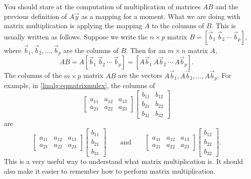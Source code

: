 \documentclass{ximera}
\begin{document}
You should stare at the computation of multiplication of matrices $AB$ and the previous definition of $A\vec{y}$ as a mapping for a moment. What we are doing with matrix multiplication is applying the mapping $A$ to the columns of $B$.  This is usually written as follows. Suppose we write the $n \times p$ matrix $B = [ \vec{b}_1 ~ \vec{b}_2 ~ \cdots ~ \vec{b}_p ]$, where $\vec{b}_1, \vec{b}_2, \ldots, \vec{b}_p$ are the columns of $B$. Then for an $m \times n$ matrix $A$,
\begin{equation*}
    AB =  A [ \vec{b}_1 ~ \vec{b}_2 ~ \cdots ~ \vec{b}_p ] = [ A\vec{b}_1 ~ A\vec{b}_2 ~ \cdots ~ A\vec{b}_p ] .
\end{equation*}
The columns of the $m \times p$ matrix $AB$ are the vectors $A\vec{b}_1, A\vec{b}_2, \ldots, A\vec{b}_p$. For example, in \eqref{linalg:eqmatrixmulex}, the columns of 
\begin{equation*}
    \begin{bmatrix}
        a_{11} & a_{12} & a_{13} \\
        a_{21} & a_{22} & a_{23}
    \end{bmatrix}
    \begin{bmatrix}
        b_{11} & b_{12} \\
        b_{21} & b_{22} \\
        b_{31} & b_{32}
    \end{bmatrix}
\end{equation*}
are
\begin{equation*}
    \begin{bmatrix}
        a_{11} & a_{12} & a_{13} \\
        a_{21} & a_{22} & a_{23}
    \end{bmatrix}
    \begin{bmatrix}
        b_{11} \\
        b_{21} \\
        b_{31}
    \end{bmatrix}
    \qquad \text{and} \qquad
    \begin{bmatrix}
        a_{11} & a_{12} & a_{13} \\
        a_{21} & a_{22} & a_{23}
    \end{bmatrix}
    \begin{bmatrix}
        b_{12} \\
        b_{22} \\
        b_{32}
    \end{bmatrix} .
\end{equation*}
This is a very useful way to understand what matrix multiplication is. It should also make it easier to remember how to perform matrix multiplication.
\end{document}
